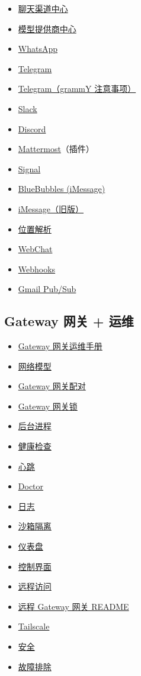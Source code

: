 \begin{itemize}
  \item \href{/channels}{聊天渠道中心}
  \item \href{/providers/models}{模型提供商中心}
  \item \href{/channels/whatsapp}{WhatsApp}
  \item \href{/channels/telegram}{Telegram}
  \item \href{/channels/grammy}{Telegram（grammY 注意事项）}
  \item \href{/channels/slack}{Slack}
  \item \href{/channels/discord}{Discord}
  \item \href{/channels/mattermost}{Mattermost}（插件）
  \item \href{/channels/signal}{Signal}
  \item \href{/channels/bluebubbles}{BlueBubbles (iMessage)}
  \item \href{/channels/imessage}{iMessage（旧版）}
  \item \href{/channels/location}{位置解析}
  \item \href{/web/webchat}{WebChat}
  \item \href{/automation/webhook}{Webhooks}
  \item \href{/automation/gmail-pubsub}{Gmail Pub/Sub}
\end{itemize}


\subsection{Gateway 网关 + 运维}


\begin{itemize}
  \item \href{/gateway}{Gateway 网关运维手册}
  \item \href{/gateway/network-model}{网络模型}
  \item \href{/gateway/pairing}{Gateway 网关配对}
  \item \href{/gateway/gateway-lock}{Gateway 网关锁}
  \item \href{/gateway/background-process}{后台进程}
  \item \href{/gateway/health}{健康检查}
  \item \href{/gateway/heartbeat}{心跳}
  \item \href{/gateway/doctor}{Doctor}
  \item \href{/gateway/logging}{日志}
  \item \href{/gateway/sandboxing}{沙箱隔离}
  \item \href{/web/dashboard}{仪表盘}
  \item \href{/web/control-ui}{控制界面}
  \item \href{/gateway/remote}{远程访问}
  \item \href{/gateway/remote-gateway-readme}{远程 Gateway 网关 README}
  \item \href{/gateway/tailscale}{Tailscale}
  \item \href{/gateway/security}{安全}
  \item \href{/gateway/troubleshooting}{故障排除}
\end{itemize}


